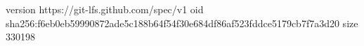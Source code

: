 version https://git-lfs.github.com/spec/v1
oid sha256:f6eb0eb59990872ade5c188b64f54f30e684df86af523fddce5179cb7f7a3d20
size 330198
